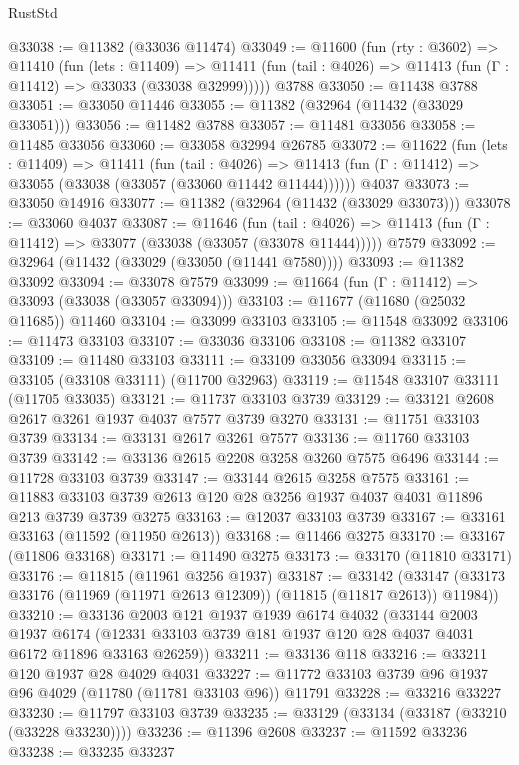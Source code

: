 \begin{lexlean}{RustStd}
\begin{coremodule}
@33038 := @11382 (@33036 @11474)
@33049 := @11600
    (fun (rty : @3602) =>
    @11410
      (fun (lets : @11409) =>
      @11411 (fun (tail : @4026) => @11413 (fun (Γ : @11412) => @33033 (@33038 @32999)))))
    @3788
@33050 := @11438 @3788
@33051 := @33050 @11446
@33055 := @11382 (@32964 (@11432 (@33029 @33051)))
@33056 := @11482 @3788
@33057 := @11481 @33056
@33058 := @11485 @33056
@33060 := @33058 @32994 @26785
@33072 := @11622
    (fun (lets : @11409) =>
    @11411
      (fun (tail : @4026) =>
      @11413 (fun (Γ : @11412) => @33055 (@33038 (@33057 (@33060 @11442 @11444))))))
    @4037
@33073 := @33050 @14916
@33077 := @11382 (@32964 (@11432 (@33029 @33073)))
@33078 := @33060 @4037
@33087 := @11646
    (fun (tail : @4026) => @11413 (fun (Γ : @11412) => @33077 (@33038 (@33057 (@33078 @11444)))))
    @7579
@33092 := @32964 (@11432 (@33029 (@33050 (@11441 @7580))))
@33093 := @11382 @33092
@33094 := @33078 @7579
@33099 := @11664 (fun (Γ : @11412) => @33093 (@33038 (@33057 @33094)))
@33103 := @11677 (@11680 (@25032 @11685)) @11460
@33104 := @33099 @33103
@33105 := @11548 @33092
@33106 := @11473 @33103
@33107 := @33036 @33106
@33108 := @11382 @33107
@33109 := @11480 @33103
@33111 := @33109 @33056 @33094
@33115 := @33105 (@33108 @33111) (@11700 @32963)
@33119 := @11548 @33107 @33111 (@11705 @33035)
@33121 := @11737 @33103 @3739
@33129 := @33121 @2608 @2617 @3261 @1937 @4037 @7577 @3739 @3270
@33131 := @11751 @33103 @3739
@33134 := @33131 @2617 @3261 @7577
@33136 := @11760 @33103 @3739
@33142 := @33136 @2615 @2208 @3258 @3260 @7575 @6496
@33144 := @11728 @33103 @3739
@33147 := @33144 @2615 @3258 @7575
@33161 := @11883 @33103 @3739 @2613 @120 @28 @3256 @1937 @4037 @4031 @11896 @213 @3739 @3739 @3275
@33163 := @12037 @33103 @3739
@33167 := @33161 @33163 (@11592 (@11950 @2613))
@33168 := @11466 @3275
@33170 := @33167 (@11806 @33168)
@33171 := @11490 @3275
@33173 := @33170 (@11810 @33171)
@33176 := @11815 (@11961 @3256 @1937)
@33187 := @33142
    (@33147 (@33173 @33176 (@11969 (@11971 @2613 @12309)) (@11815 (@11817 @2613)) @11984))
@33210 := @33136
    @2003
    @121
    @1937
    @1939
    @6174
    @4032
    (@33144
      @2003
      @1937
      @6174
      (@12331 @33103 @3739 @181 @1937 @120 @28 @4037 @4031 @6172 @11896 @33163 @26259))
@33211 := @33136 @118
@33216 := @33211 @120 @1937 @28 @4029 @4031
@33227 := @11772 @33103 @3739 @96 @1937 @96 @4029 (@11780 (@11781 @33103 @96)) @11791
@33228 := @33216 @33227
@33230 := @11797 @33103 @3739
@33235 := @33129 (@33134 (@33187 (@33210 (@33228 @33230))))
@33236 := @11396 @2608
@33237 := @11592 @33236
@33238 := @33235 @33237

\end{coremodule}
\end{lexlean}

